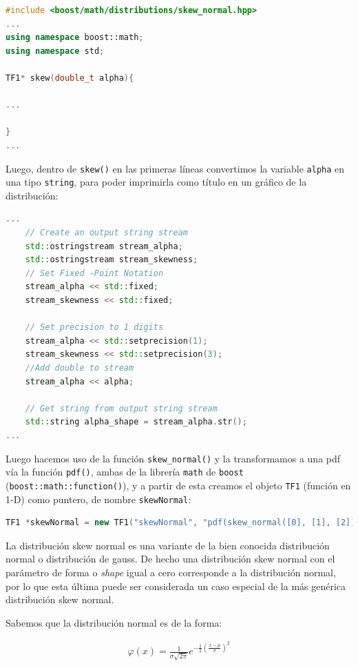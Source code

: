 \documentclass[11pt,letterpaper]{article}
\begin{document}
\begin{lstlisting}[language=c++]
#include <boost/math/distributions/skew_normal.hpp>
...
using namespace boost::math;
using namespace std;

TF1* skew(double_t alpha){

...

}
...
\end{lstlisting}

Luego, dentro de \verb|skew()| en las primeras líneas convertimos la variable \verb|alpha| en una tipo \verb|string|, para poder imprimirla como título en un gráfico de la distribución:

\begin{lstlisting}[language=c++]
...
	// Create an output string stream
	std::ostringstream stream_alpha;
	std::ostringstream stream_skewness;
	// Set Fixed -Point Notation
	stream_alpha << std::fixed;
	stream_skewness << std::fixed;
	
	// Set precision to 1 digits
	stream_alpha << std::setprecision(1);
	stream_skewness << std::setprecision(3);
	//Add double to stream
	stream_alpha << alpha;
	
	// Get string from output string stream
	std::string alpha_shape = stream_alpha.str();
...
\end{lstlisting}

Luego hacemos uso de la función \verb|skew_normal()| y la transformamos a una pdf vía la función \verb|pdf()|, ambas de la librería \verb|math| de \verb|boost| (\verb|boost::math::function()|), y a partir de esta creamos el objeto \verb|TF1| (función en 1-D) como puntero, de nombre \verb|skewNormal|:

\begin{lstlisting}[language=c++]
TF1 *skewNormal = new TF1("skewNormal", "pdf(skew_normal([0], [1], [2]), x)",0,7);
\end{lstlisting}\label{skew_normal_code_def}


La distribución skew normal es una variante de la bien conocida distribución normal o distribución de gauss. De hecho una distribución skew normal con el parámetro de forma o \textit{shape} igual a cero corresponde a la distribución normal, por lo que esta última puede ser considerada un caso especial de la más genérica distribución skew normal.

Sabemos que la distribución normal es de la forma:

\begin{align}
{\displaystyle \varphi(x)={\frac {1}{\sigma {\sqrt {2\pi }}}}e^{-{\frac {1}{2}}\left({\frac {x-\mu }{\sigma }}\right)^{2}}}
\end{align}
\end{document}
